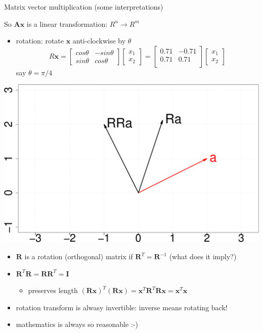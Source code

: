 \documentclass[ignorenonframetext,]{beamer}
\providecommand{\tightlist}{%
  \setlength{\itemsep}{0pt}\setlength{\parskip}{0pt}}
\newcommand{\vv}[1]{\boldsymbol{#1}}
\begin{document}
\begin{frame}{Matrix vector multiplication (some interpretations)}
\protect\hypertarget{matrix-vector-multiplication-some-interpretations}{}

So \(\vv{A}\vv{x}\) is a linear transformation: \(R^n\rightarrow R^m\)

\begin{itemize}
\tightlist
\item
  rotation: rotate \(\vv{x}\) anti-clockwise by \(\theta\)
  \[R\vv{x} = \begin{bmatrix} cos\theta & -sin\theta \\
  sin\theta & cos\theta\end{bmatrix} \begin{bmatrix} x_1\\ x_2\end{bmatrix} = \begin{bmatrix}0.71&-0.71 \\0.71&0.71 \\\end{bmatrix} \begin{bmatrix} x_1\\ x_2\end{bmatrix}\]
  say \(\theta = \pi/4\)
\end{itemize}

\begin{center}\includegraphics[width=0.5\linewidth]{math4ml_files/figure-beamer/unnamed-chunk-10-1} \end{center}

\end{frame}

\begin{frame}{}
\protect\hypertarget{section-4}{}

\begin{itemize}
\tightlist
\item
  \(\vv{R}\) is a rotation (orthogonal) matrix if
  \(\vv{R}^T = \vv{R}^{-1}\) (what does it imply?)
\item
  \(\vv{R}^T\vv{R} = \vv{R}\vv{R}^T =\vv{I}\) \pause 

  \begin{itemize}
  \tightlist
  \item
    preserves length
    \((\vv{R}\vv{x})^T(\vv{R}\vv{x}) = \vv{x}^T\vv{R}^T\vv{R}\vv{x} = \vv{x}^T\vv{x}\)
  \end{itemize}
\item
  rotation transform is alwasy invertible: inverse means rotating back!
\item
  mathematics is always so reasonable :-)
\end{itemize}

\end{frame}
\end{document}
